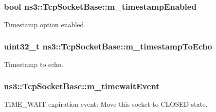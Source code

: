 \subsubsection[{\texorpdfstring{m\+\_\+timestamp\+Enabled}{m_timestampEnabled}}]{\setlength{\rightskip}{0pt plus 5cm}bool ns3\+::\+Tcp\+Socket\+Base\+::m\+\_\+timestamp\+Enabled\hspace{0.3cm}{\ttfamily [protected]}}\hypertarget{classns3_1_1TcpSocketBase_a5a7f7e51b07e27a908d4bab44028eee1}{}\label{classns3_1_1TcpSocketBase_a5a7f7e51b07e27a908d4bab44028eee1}


Timestamp option enabled. 

\subsubsection[{\texorpdfstring{m\+\_\+timestamp\+To\+Echo}{m_timestampToEcho}}]{\setlength{\rightskip}{0pt plus 5cm}uint32\+\_\+t ns3\+::\+Tcp\+Socket\+Base\+::m\+\_\+timestamp\+To\+Echo\hspace{0.3cm}{\ttfamily [protected]}}\hypertarget{classns3_1_1TcpSocketBase_ab3fdcb2bbc5e6a064e004e0671875996}{}\label{classns3_1_1TcpSocketBase_ab3fdcb2bbc5e6a064e004e0671875996}


Timestamp to echo. 

\subsubsection[{\texorpdfstring{m\+\_\+timewait\+Event}{m_timewaitEvent}}]{ ns3\+::\+Tcp\+Socket\+Base\+::m\+\_\+timewait\+Event\hspace{0.3cm}{\ttfamily [protected]}}\hypertarget{classns3_1_1TcpSocketBase_a49b5b01bd6e824835859a9983465c9f2}{}\label{classns3_1_1TcpSocketBase_a49b5b01bd6e824835859a9983465c9f2}


T\+I\+M\+E\+\_\+\+W\+A\+IT expiration event\+: Move this socket to C\+L\+O\+S\+ED state. 

